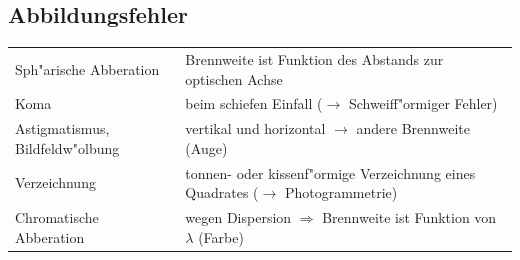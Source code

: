 \subsection{Abbildungsfehler}
\begin{tabular}{ll}
  Sph"arische Abberation & Brennweite ist Funktion des Abstands zur optischen
  Achse \\
  Koma & beim schiefen Einfall ($\rightarrow$ Schweiff"ormiger Fehler) \\
  Astigmatismus, Bildfeldw"olbung & vertikal und horizontal $\rightarrow$ andere
  Brennweite (Auge) \\
  Verzeichnung & tonnen- oder kissenf"ormige Verzeichnung eines Quadrates
  ($\rightarrow$ Photogrammetrie) \\
  Chromatische Abberation & wegen Dispersion $\Rightarrow$ Brennweite ist
  Funktion von $\lambda$ (Farbe) \\
\end{tabular}




